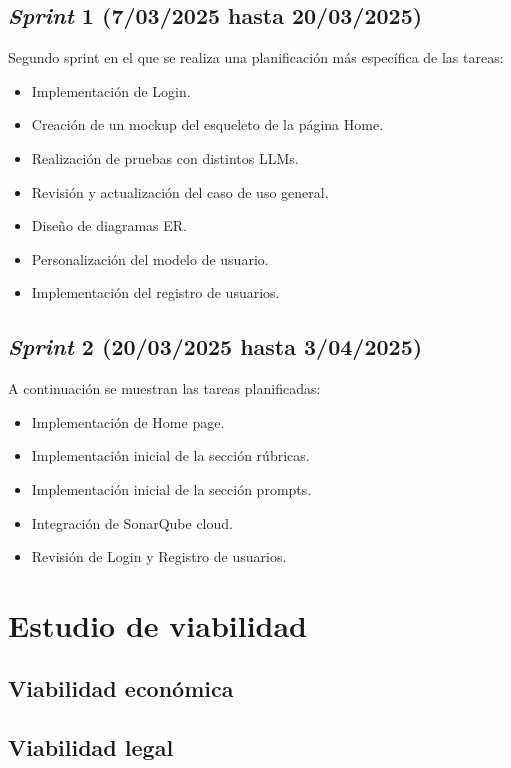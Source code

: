 \subsection{\emph{Sprint} 1 (7/03/2025 hasta 20/03/2025)}
Segundo sprint en el que se realiza una planificación más específica de las tareas:
\begin{itemize}
    \item Implementación de Login.
    \item Creación de un mockup del esqueleto de la página Home.
    \item Realización de pruebas con distintos LLMs.
    \item Revisión y actualización del caso de uso general.
    \item Diseño de diagramas ER.
    \item Personalización del modelo de usuario.
    \item Implementación del registro de usuarios.
\end{itemize}

\subsection{\emph{Sprint} 2 (20/03/2025 hasta 3/04/2025)}
A continuación se muestran las tareas planificadas:
\begin{itemize}
    \item Implementación de Home page.
    \item Implementación inicial de la sección rúbricas.
    \item Implementación inicial de la sección prompts.
    \item Integración de SonarQube cloud.
    \item Revisión de Login y Registro de usuarios.
\end{itemize}


\section{Estudio de viabilidad}

\subsection{Viabilidad económica}

\subsection{Viabilidad legal}


